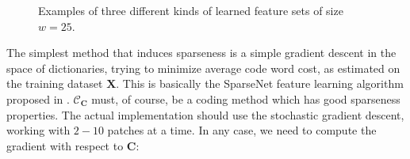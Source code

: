 \documentclass[12pt,a4paper,oneside,english]{UPBThesis}
\begin{document}
\begin{figure}
\centering
{}
\caption{Examples of three different kinds of learned feature sets of size $w=25$.}
\label{fig:ObtainingSetLearn}
\end{figure}

The simplest method that induces sparseness is a simple gradient descent in the space of dictionaries, trying to minimize average code word cost, as estimated on the training dataset $\textbf{X}$. This is basically the SparseNet feature learning algorithm proposed in \cite{emergence-sparse-coding}. $\mathcal{C}_\textbf{C}$ must, of course, be a coding method which has good sparseness properties. The actual implementation should use the stochastic gradient descent, working with $2-10$ patches at a time. In any case, we need to compute the gradient with respect to $\textbf{C}$:
\end{document}
